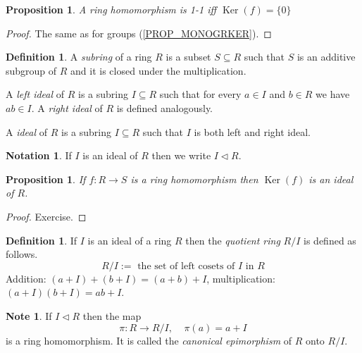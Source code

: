 \documentclass[12pt, letterpaper, oneside]{article}
\theoremstyle{plain}
\newtheorem{proposition}[theorem]{Proposition}
\theoremstyle{definition}
\newtheorem{definition}[theorem]{Definition}
\newtheorem{notation}[theorem]{Notation}
\newtheorem{note}[theorem]{Note}
\newcommand{\Ker}{\operatorname{Ker}}
\newcommand{\vs}{\vskip 5mm}
\begin{document}
\begin{proposition}
A ring homomorphism is 1-1 iff $\Ker(f) = \{0\}$
\end{proposition}

\vs

\begin{proof}
The same as for groups (\ref{PROP_MONOGRKER}).
\end{proof}

\vs\vs


\begin{definition}
A \emph{subring} of a ring $R$ is a subset $S\subseteq R$ such that $S$ is an additive subgroup 
of $R$ and it is closed under the multiplication.

A \emph{left  ideal} of $R$ is a subring $I\subseteq R$ such that for every $a\in I$ and $b\in R$
we have $ab\in I$. A \emph{right ideal} of $R$ is defined analogously. 

A \emph{ideal} of $R$ is a subring $I\subseteq R$ such that $I$ is both left and right 
ideal. 
\end{definition}


\vs\vs

\begin{notation}
If $I$ is an ideal of $R$ then we write $I\lhd R$.
\end{notation}

\vs\vs

\begin{proposition}
If $f\colon R \to S$ is a ring homomorphism then $\Ker(f)$ is an ideal of $R$. 
\end{proposition}

\vs

\begin{proof}
Exercise.
\end{proof}


\vs\vs

\begin{definition}
If $I$ is an ideal of a ring $R$ then the \emph{quotient ring} $R/I$ is defined as follows. 
$$R/I := \text{ the set of left cosets of $I$ in $R$}$$ 
Addition: $(a+ I) + (b + I) = (a+b) + I$, multiplication: $(a+I) (b+I) = ab +I $.
\end{definition}

\vs\vs

\begin{note}
If $I \lhd R$ then the map
$$\pi\colon R \to R/I, \ \ \ \ \ \pi(a) = a + I$$
is a ring homomorphism. It is called the \emph{canonical epimorphism} of $R$ onto $R/I$.
\end{note}
\end{document}
